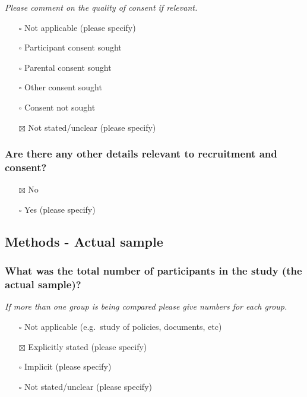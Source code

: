 \documentclass[
  doc, a4paper]{apa7}
\providecommand{\tightlist}{%
  \setlength{\itemsep}{0pt}\setlength{\parskip}{0pt}}
\begin{document}
\emph{Please comment on the quality of consent if relevant.}

\begin{itemize}
\tightlist
\item[$\square$]
  Not applicable (please specify)
\item[$\square$]
  Participant consent sought
\item[$\square$]
  Parental consent sought
\item[$\square$]
  Other consent sought
\item[$\square$]
  Consent not sought
\item[$\boxtimes$]
  Not stated/unclear (please specify)
\end{itemize}

\subsubsection{Are there any other details relevant to recruitment and consent?}\label{are-there-any-other-details-relevant-to-recruitment-and-consent}

\begin{itemize}
\tightlist
\item[$\boxtimes$]
  No
\item[$\square$]
  Yes (please specify)
\end{itemize}

\subsection{Methods - Actual sample}\label{methods---actual-sample}

\subsubsection{What was the total number of participants in the study (the actual sample)?}\label{what-was-the-total-number-of-participants-in-the-study-the-actual-sample}

\emph{If more than one group is being compared please give numbers for each group.}

\begin{itemize}
\tightlist
\item[$\square$]
  Not applicable (e.g.~study of policies, documents, etc)
\item[$\boxtimes$]
  Explicitly stated (please specify)
\item[$\square$]
  Implicit (please specify)
\item[$\square$]
  Not stated/unclear (please specify)
\end{itemize}
\end{document}

